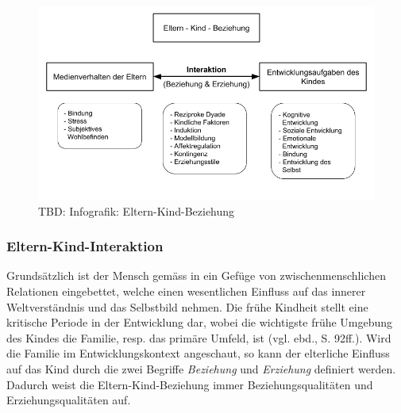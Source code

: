 \begin{figure}%
  \centering
     \includegraphics[width=1.0\textwidth]{content/Grafik/Infografik_ElternKindBeziehung_Uebersicht.png}
  \caption{TBD: Infografik: Eltern-Kind-Beziehung}
  \label{fig:InfografikElternKindBeziehung}
\end{figure}

\subsubsection{Eltern-Kind-Interaktion}\label{sec:Interaktion}
Grundsätzlich ist der Mensch gemäss  in ein Gefüge von zwischenmenschlichen Relationen eingebettet, welche einen wesentlichen Einfluss auf das innerer Weltverständnis und das Selbstbild nehmen.  Die frühe Kindheit stellt eine kritische Periode in der Entwicklung dar, wobei die wichtigste frühe Umgebung des Kindes die Familie, resp. das primäre Umfeld, ist (vgl. ebd., S. 92ff.). Wird die Familie im Entwicklungskontext angeschaut, so kann der elterliche Einfluss auf das Kind durch die zwei Begriffe \textit{Beziehung} und \textit{Erziehung} definiert werden. Dadurch weist die Eltern-Kind-Beziehung immer Beziehungsqualitäten und Erziehungsqualitäten auf.  

